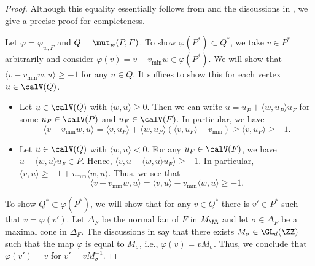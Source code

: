 \begin{proof}
Although this equality essentially follows from \cite[Proposition~4]{ACGK} and the discussions in \cite[p.~12]{ACGK}, we give a precise proof for completeness.

Let $\varphi=\varphi_{w,F}$ and $Q=\mut_w(P,F)$.
To show $\varphi(P^*)\subset Q^*$, we take $v \in P^*$ arbitrarily and consider $\varphi(v)=v - v_{\min}w \in \varphi(P^*)$.
We will show that $\langle v - v_{\min}w,u \rangle \geq -1$ for any $u \in Q$.
It suffices to show this for each vertex $u\in\calV(Q)$.
\begin{itemize}\itemsep=0pt
\item Let $u\in\calV(Q)$ with $\langle w,u \rangle \geq 0$. Then we can write $u=u_P+\langle w,u_P \rangle u_F$ for some $u_P \in \calV(P)$ and $u_F \in \calV(F)$.
In particular, we have
\begin{displaymath}
\langle v-v_{\min}w, u\rangle = \langle v,u_P \rangle + \langle w,u_P \rangle(\langle v,u_F \rangle-v_{\min}) \geq \langle v,u_P \rangle \geq -1.
\end{displaymath}

\item Let $u\in\calV(Q)$ with $\langle w,u \rangle < 0$. For any $u_F \in \calV(F)$, we have $u-\langle w,u \rangle u_F \in P$.
Hence, $\langle v,u-\langle w,u \rangle u_F \rangle \geq -1$. In particular, $\langle v,u \rangle \geq -1 + v_{\min} \langle w,u \rangle$. Thus, we see that
\begin{displaymath}
\langle v-v_{\min}w, u\rangle =\langle v, u\rangle - v_{\min} \langle w, u\rangle \geq -1.
\end{displaymath}
\end{itemize}

To show $Q^*\subset\varphi(P^*)$, we will show that for any $v \in Q^*$ there is $v' \in P^*$ such that $v=\varphi(v')$.
Let $\Delta_F$ be the normal fan of $F$ in $M_\RR$ and let $\sigma \in \Delta_F$ be a maximal cone in $\Delta_F$.
The discussions in \cite[p.~12]{ACGK} say that there exists $M_\sigma \in \GL_d(\ZZ)$ such that the map $\varphi$ is equal to $M_\sigma$,
i.e., $\varphi(v)=vM_\sigma$. Thus, we conclude that $\varphi(v')=v$ for $v'=vM_\sigma^{-1}$.
\end{proof}
